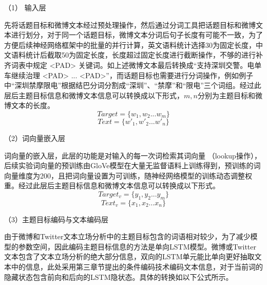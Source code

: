 （1） 输入层

先将话题目标和微博文本经过预处理操作，然后通过分词工具把话题目标和微博文本进行划分，对于同一个话题目标，微博文本分词后句子长度有可能不一致，为了方便后续神经网络框架中的批量的并行计算，英文语料统计选择30为固定长度，中文语料统计后截取50为固定长度，长度超过固定长度进行截断操作，不够的进行补齐词表中规定 <PAD> 关键词。如上述微博文本最后转换成“支持深圳交警。电单车继续治理 <PAD> ... <PAD>”，而话题目标也需要进行分词操作，例如例子中“深圳禁摩限电”根据结巴分词分割成“深圳”、“禁摩”和“限电”三个词组。经过此层后主题目标信息和微博文本信息可以转换成以下形式，$m,n$分别为主题目标和微博文本的长度。
\begin{equation}\label{target_info} Target= \lbrace w_1,w_2...w_m\rbrace \end{equation}
\begin{equation}\label{text_info} Text=\lbrace w'_1,w'_2...w'_n\rbrace  \end{equation}

（2）词向量嵌入层

词向量的嵌入层，此层的功能是对输入的每一次词检索其词向量 （lookup操作），后续实验词向量的预训练由GloVe模型在大量无监督语料上训练得到，预训练的词向量维度为200，且把词向量设置为可训练，随神经网络模型的训练动态调整权重。经过此层后主题目标信息和微博文本信息可以转换成以下形式。
\begin{equation}\label{target_info} Target_v= \lbrace y_1,y_2...y_m\rbrace \end{equation}
\begin{equation}\label{text_info} Text_v=\lbrace x_1,x_2...x_n\rbrace \end{equation}

（3）主题目标编码与文本编码层

由于微博和Twitter文本立场分析中的主题目标包含的词语相对较少，为了减少模型的参数空间，因此编码主题目标信息的方法是单向LSTM模型。微博或Twitter文本包含了文本立场分析的绝大部分信息，双向的LSTM单元能比单向更好抽取文本中的信息，此处采用第三章节提出的条件编码技术编码文本信息，对于当前词的隐藏状态包含前向和后向的LSTM隐状态。具体的转换如以下公式所示。


